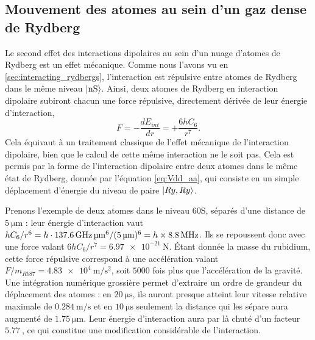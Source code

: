 \newpage
	\subsection{Mouvement des atomes au sein d'un gaz dense de Rydberg}
	\noindent Le second effet des interactions dipolaires au sein d'un nuage d'atomes de Rydberg est un effet mécanique.
Comme nous l'avons vu en \ref{sec:interacting_rydbergs}, l'interaction est répulsive entre atomes de Rydberg dans le même niveau $\ket{\mathrm{nS}}$.
Ainsi, deux atomes de Rydberg en interaction dipolaire subiront chacun une force répulsive, directement dérivée de leur énergie d'interaction,
\begin{equation}
\label{eq:repuls_2atoms}
F = - \frac{d E_{int}}{dr}  = + \frac{6hC_6}{r^7}.
\end{equation}
Cela équivaut à un traitement classique de l'effet mécanique de l'interaction dipolaire, bien que le calcul de cette même interaction ne le soit pas.
Cela est permis par la forme de l'interaction dipolaire entre deux atomes dans le même état de Rydberg, donnée par l'équation \eqref{eq:Vdd_aa}, qui consiste en un simple déplacement d'énergie du niveau de paire $\ket{Ry,Ry}$.

Prenons l'exemple de deux atomes dans le niveau $\mathrm{60S}$, séparés d'une distance de $\SI{5}{\um}$ : leur énergie d'interaction vaut $hC_6/r^6 = h\cdot {\SI{137.6}{\GHz\raiseto{6}\um}}/(\SI{5}{\um})^6 = h\times\SI{8.8}{\MHz}$.
Ils se repoussent donc avec une force valant %
$6hC_6/r^7 =\SI{6.97e-21}{\newton}$.
Étant donnée la masse du rubidium, cette force répulsive correspond à une accélération valant $F/m_{Rb87} = \SI{4.83e4}{\m\per\s\squared}$, soit $\num{5000}$ fois plus que l'accélération de la gravité.
Une intégration numérique grossière permet d'extraire un ordre de grandeur du déplacement des atomes : en $\SI{20}{\us}$, ils auront presque atteint leur vitesse relative maximale de $\SI{0.284}{\m\per\s}$ et en $\SI{10}{\us}$ seulement la distance qui les sépare aura augmenté de $\SI{1.75}{\um}$.
Leur énergie d'interaction aura par là chuté d'un facteur $\SI{5.77}{}$, ce qui constitue une modification considérable de l'interaction.

